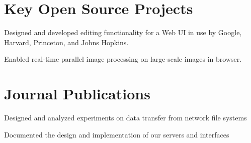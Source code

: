 \documentclass[]{deedy-resume-openfont}
\begin{document}
\begin{minipage}[t]{0.66\textwidth}
\section{Key Open Source Projects}
\begin{tightemize}
\item Designed and developed editing functionality for a Web UI in use by Google, Harvard, Princeton, and Johns Hopkins.
\end{tightemize}
\sectionsep
{}
\begin{tightemize}
\item Enabled real-time parallel image processing on large-scale images in browser.
\end{tightemize}
\sectionsep


\section{Journal Publications}
\begin{tightemize}
\item Designed and analyzed experiments on data transfer from network file systems
\item Documented the design and implementation of our servers and interfaces
\end{tightemize}
\sectionsep
\end{minipage} 

\end{document}
